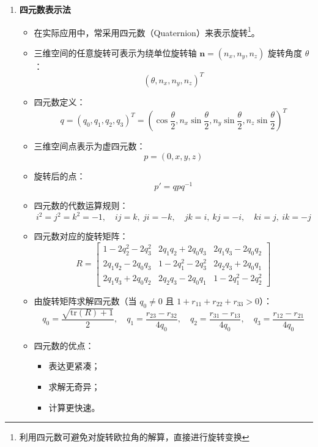 \documentclass[../main.tex]{subfiles}
\begin{document}
\begin{enumerate}
    \item \textbf{四元数表示法}
    \begin{itemize}
        \item 在实际应用中，常采用四元数（Quaternion）来表示旋转\footnote{利用四元数可避免对旋转欧拉角的解算，直接进行旋转变换}。
        \item 三维空间的任意旋转可表示为绕单位旋转轴 $\mathbf{n} = (n_x, n_y, n_z)$ 旋转角度 $\theta$：
        \[
        (\theta, n_x, n_y, n_z)^T
        \]
        \item 四元数定义：
        \[
        q = (q_0, q_1, q_2, q_3)^T = 
        (\cos\frac{\theta}{2}, n_x\sin\frac{\theta}{2}, n_y\sin\frac{\theta}{2}, n_z\sin\frac{\theta}{2})^T
        \]
        \item 三维空间点表示为虚四元数：
        \[
        p = (0, x, y, z)
        \]
        \item 旋转后的点：
        \[
        p' = q p q^{-1}
        \]
        \item 四元数的代数运算规则：
        \[
        i^2 = j^2 = k^2 = -1,\quad
        ij = k, \ ji = -k,\quad
        jk = i, \ kj = -i,\quad
        ki = j, \ ik = -j
        \]
        \item 四元数对应的旋转矩阵：
        \[
        R = \begin{bmatrix}
            1 - 2q_2^2 - 2q_3^2 & 2q_1q_2 + 2q_0q_3 & 2q_1q_3 - 2q_0q_2 \\
            2q_1q_2 - 2q_0q_3 & 1 - 2q_1^2 - 2q_3^2 & 2q_2q_3 + 2q_0q_1 \\
            2q_1q_3 + 2q_0q_2 & 2q_2q_3 - 2q_0q_1 & 1 - 2q_1^2 - 2q_2^2
        \end{bmatrix}
        \]
        \item 由旋转矩阵求解四元数（当 $q_0 \neq 0$ 且 $1 + r_{11} + r_{22} + r_{33} > 0$）：
        \[
        q_0 = \frac{\sqrt{\mathrm{tr}(R) + 1}}{2}, \quad
        q_1 = \frac{r_{23} - r_{32}}{4q_0}, \quad
        q_2 = \frac{r_{31} - r_{13}}{4q_0}, \quad
        q_3 = \frac{r_{12} - r_{21}}{4q_0}
        \]
        \item 四元数的优点：
        \begin{itemize}
            \item 表达更紧凑；
            \item 求解无奇异；
            \item 计算更快速。
        \end{itemize}
    \end{itemize}

\end{enumerate}
\end{document}
